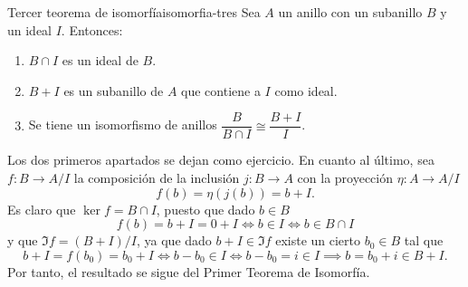 \begin{theorem}{Tercer teorema de isomorfía}{isomorfia-tres}
Sea $A$ un anillo con un subanillo $B$ y un ideal $I$. Entonces:
\begin{enumerate}
    \item $B \cap I$ es un ideal de $B$.
    \item $B + I$ es un subanillo de $A$ que contiene a $I$ como ideal.
    \item Se tiene un isomorfismo de anillos $\dfrac{B}{B \cap I} \cong \dfrac{B + I}{I}$.
\end{enumerate}
\end{theorem}

\begin{proofbox}
Los dos primeros apartados se dejan como ejercicio. En cuanto al último, sea $f : B \to A/I$ la composición de la inclusión $j : B \to A$ con la proyección $\eta : A \to A/I$
\[
f(b) = \eta(j(b)) = b + I.
\]
Es claro que $\ker f = B \cap I$, puesto que dado $b \in B$
\[
f(b) = b + I = 0 + I \iff b \in I \iff b \in B \cap I
\]
y que $\Im f = (B + I)/I$, ya que dado $b + I \in \Im f$ existe un cierto $b_0 \in B$ tal que
\[
b + I = f(b_0) = b_0 + I \iff b - b_0 \in I \iff b - b_0 = i \in I \implies b = b_0 + i \in B + I.
\]
Por tanto, el resultado se sigue del Primer Teorema de Isomorfía.
\end{proofbox}


